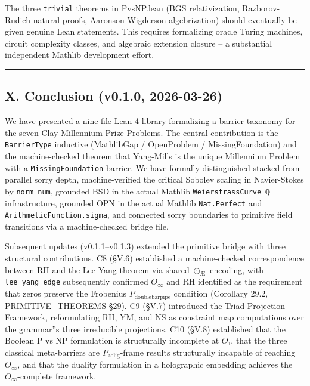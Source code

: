 \documentclass[12pt,a4paper]{article}
\newcommand{\pilcrow}{\S}
\begin{document}
The three \texttt{trivial} theorems in PvsNP.lean (BGS relativization, Razborov-Rudich natural proofs, Aaronson-Wigderson algebrization) should eventually be given genuine Lean statements. This requires formalizing oracle Turing machines, circuit complexity classes, and algebraic extension closure  --  a substantial independent Mathlib development effort.

\begin{center}
\rule{0.5\textwidth}{0.4pt}
\end{center}

\subsection{X. Conclusion (v0.1.0, 2026-03-26)}

We have presented a nine-file Lean 4 library formalizing a barrier taxonomy for the seven Clay Millennium Prize Problems. The central contribution is the \texttt{BarrierType} inductive (MathlibGap / OpenProblem / MissingFoundation) and the machine-checked theorem that Yang-Mills is the unique Millennium Problem with a \texttt{MissingFoundation} barrier. We have formally distinguished stacked from parallel sorry depth, machine-verified the critical Sobolev scaling in Navier-Stokes by \texttt{norm\_num}, grounded BSD in the actual Mathlib \texttt{WeierstrassCurve ℚ} infrastructure, grounded OPN in the actual Mathlib \texttt{Nat.Perfect} and \texttt{ArithmeticFunction.sigma}, and connected sorry boundaries to primitive field transitions via a machine-checked bridge file.

Subsequent updates (v0.1.1--v0.1.3) extended the primitive bridge with three structural contributions. C8 (\pilcrow{}V.6) established a machine-checked correspondence between RH and the Lee-Yang theorem via shared $\odot_{\text{Æ}}$ encoding, with \texttt{lee\_yang\_edge} subsequently confirmed $O_{\infty}$ and RH identified as the requirement that zeros preserve the Frobenius $P_{\text{doublebarpipe}}$ condition (Corollary 29.2, PRIMITIVE\_THEOREMS \pilcrow{}29). C9 (\pilcrow{}V.7) introduced the Triad Projection Framework, reformulating RH, YM, and NS as constraint map computations over the grammar''s three irreducible projections. C10 (\pilcrow{}V.8) established that the Boolean P vs NP formulation is structurally incomplete at $O₁$, that the three classical meta-barriers are $P_{\text{aolig}}$-frame results structurally incapable of reaching $O_{\infty}$, and that the duality formulation in a holographic embedding achieves the $O_{\infty}$-complete framework.
\end{document}
